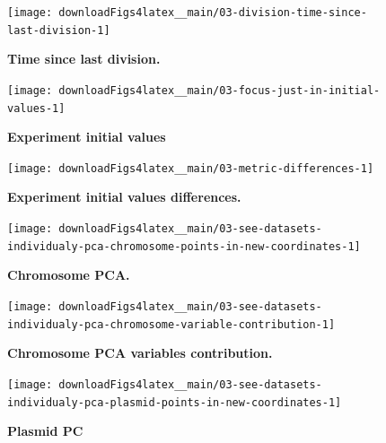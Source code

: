 \documentclass[a4paper, nobind]{templates/ociamthesis}
\begin{document}
\begin{figure}[H]
\texttt{[image: downloadFigs4latex\_\_main/03-division-time-since-last-division-1]} \caption[Time since last division.]{\textbf{Time since last division.}}\label{fig:03-division-time-since-last-division-1}
\end{figure}





\begin{figure}[H]
\texttt{[image: downloadFigs4latex\_\_main/03-focus-just-in-initial-values-1]} \caption[Experiment initial values.]{\textbf{Experiment initial values}}\label{fig:03-focus-just-in-initial-values-1}
\end{figure}





\begin{figure}[H]
\texttt{[image: downloadFigs4latex\_\_main/03-metric-differences-1]} \caption[Experiment initial values differences.]{\textbf{Experiment initial values differences.}}\label{fig:03-metric-differences-1}
\end{figure}





\begin{figure}[H]
\texttt{[image: downloadFigs4latex\_\_main/03-see-datasets-individualy-pca-chromosome-points-in-new-coordinates-1]} \caption[Chromosome PCA.]{\textbf{Chromosome PCA.}}\label{fig:03-see-datasets-individualy-pca-chromosome-points-in-new-coordinates-1}
\end{figure}





\begin{figure}[H]
\texttt{[image: downloadFigs4latex\_\_main/03-see-datasets-individualy-pca-chromosome-variable-contribution-1]} \caption[Chromosome PCA variables contribution.]{\textbf{Chromosome PCA variables contribution.}}\label{fig:03-see-datasets-individualy-pca-chromosome-variable-contribution-1}
\end{figure}





\begin{figure}[H]
\texttt{[image: downloadFigs4latex\_\_main/03-see-datasets-individualy-pca-plasmid-points-in-new-coordinates-1]} \caption[Plasmid PCA.]{\textbf{Plasmid PC}}\label{fig:03-see-datasets-individualy-pca-plasmid-points-in-new-coordinates-1}
\end{figure}
\end{document}
